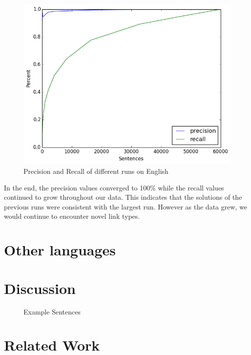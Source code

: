 \documentclass[11pt]{article}
\begin{document}
\begin{figure}[ht!]
  \includegraphics[width=\linewidth, keepaspectratio=true]{figure/precision_recall.png}
  \caption{Precision and Recall of different runs on English}
\end{figure}

In the end, the precision values converged to 100\% while the recall values continued to grow throughout our data. This indicates that the solutions of the previous runs were consistent with the largest run. However as the data grew, we would continue to encounter novel link types.



\section{Other languages}






\section{Discussion}


\begin{figure}[ht!]
  \centering
  
  \caption{Example Sentences}
\end{figure}



\section{Related Work}







\end{document}
